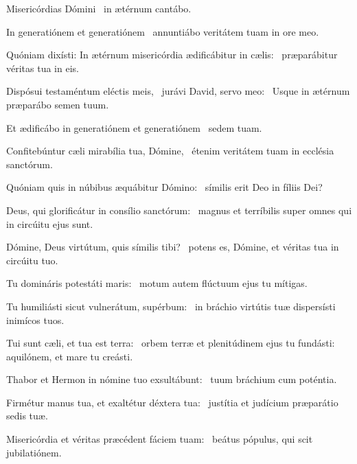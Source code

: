 \item Misericórdias Dómini~\psstar{} in ætérnum cantábo.

\item In generatiónem et generatiónem~\psstar{} annuntiábo veritátem tuam in ore meo.

\item Quóniam dixísti: In ætérnum misericórdia ædificábitur in cælis:~\psstar{} præparábitur véritas tua in eis.

\item Dispósui testaméntum eléctis meis,~\pscross{} jurávi David, servo meo:~\psstar{} Usque in ætérnum præparábo semen tuum.

\item Et ædificábo in generatiónem et generatiónem~\psstar{} sedem tuam.

\item Confitebúntur cæli mirabília tua, Dómine,~\psstar{} étenim veritátem tuam in ecclésia sanctórum.

\item Quóniam quis in núbibus æquábitur Dómino:~\psstar{} símilis erit Deo in fíliis Dei?

\item Deus, qui glorificátur in consílio sanctórum:~\psstar{} magnus et terríbilis super omnes qui in circúitu ejus sunt.

\item Dómine, Deus virtútum, quis símilis tibi?~\psstar{} potens es, Dómine, et véritas tua in circúitu tuo.

\item Tu domináris potestáti maris:~\psstar{} motum autem flúctuum ejus tu mítigas.

\item Tu humiliásti sicut vulnerátum, supérbum:~\psstar{} in bráchio virtútis tuæ dispersísti inimícos tuos.

\item Tui sunt cæli, et tua est terra:~\pscross{} orbem terræ et plenitúdinem ejus tu fundásti:~\psstar{} aquilónem, et mare tu creásti.

\item Thabor et Hermon in nómine tuo exsultábunt:~\psstar{} tuum bráchium cum poténtia.

\item Firmétur manus tua, et exaltétur déxtera tua:~\psstar{} justítia et judícium præparátio sedis tuæ.

\item Misericórdia et véritas præcédent fáciem tuam:~\psstar{} beátus pópulus, qui scit jubilatiónem.

